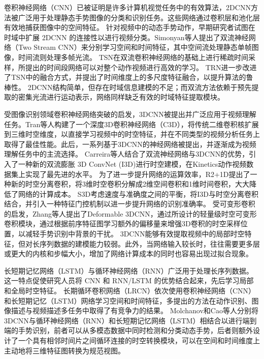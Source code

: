 卷积神经网络（CNN）已被证明是许多计算机视觉任务中的有效算法，2DCNN方法被广泛用于处理静态手势图像的分类和识别任务。这些网络通过卷积层和池化层有效地捕获图像中的空间特征。
针对视频中的动态手势动作，早期研究者试图在时域中扩展 2DCNN 的连接性以进行视频分类\cite{karpathy2014large}。Simonyan等人\cite{simonyan2014twostream}提出了双流神经网络（Two Stream CNN）来分别学习空间和时间特征，其中空间流处理静态单帧图像，时间流则处理多帧光流。
TSN\cite{wang2016tsn}在双流卷积神经网络的基础上进行稀疏时间采样，所提出的时间段网络可以对整个动作视频进行高效的学习。
TRN\cite{zhou2018trn}进一步改进了TSN中的融合方式，并提出了时间维度上的多尺度特征融合，以提升算法的鲁棒性。
2DCNN结构简单，但存在时域信息建模的不足；而双流方法依赖于预先提取的密集光流进行运动表示，网络同样缺乏有效的时域特征提取模块。

受图像识别领域卷积神经网络突破的启发，3DCNN被提出并广泛应用于视频理解任务。Tran等人构建了一个深度3D卷积神经网络（C3D），将传统二维卷积核扩展到三维时空维度，以直接学习视频中的时空特征\cite{tran2015c3d}，并在不同类型的视频分析任务上取得了最佳性能。此后，一系列基于3DCNN的神经网络被提出，并逐渐成为视频理解任务中的主流选择。
Carreira等人\cite{carreira2017i3d}结合了双流神经网络与3DCNN的优势，引入了一种新的双流膨胀 3D ConvNet (I3D)进行时空建模，在Kinetics动作视频数据集上实现了最先进的水平。
为了进一步提升网络的运算效率，R2+1D\cite{tran2018r2+1d}提出了一种新的时空分离卷积，将3维时空卷积分解成2维空间卷积和1维时间卷积，大大降低了网络的计算成本。
S3D\cite{xie2018s3d}考虑速度与准确度之间的平衡，将I3D与时空分离卷积结合，并引入一种特征门控机制以进一步提升网络的识别准确率。
受可变形卷积的启发，Zhang等人提出了Deformable 3DCNN\cite{zhang2020deformable3d}，通过所设计的轻量级时空可变形卷积模块，通过根据前序特征图学习额外的偏移量来增强3D卷积的时空采样位置，以减轻手势识别中背景的干扰。
3DCNN能够有效提取视频中的局部时空特征，但对长序列数据的建模能力较弱。此外，当网络输入较长时，往往需要更多层或更大的内核和步幅大小，增加了网络计算成本的同时也容易出现过拟合现象。

长短期记忆网络（LSTM）\cite{yue2015beyond}与循环神经网络（RNN）\cite{jozefowicz2015empirical}广泛用于处理长序列数据。这一特点促使研究人员将 CNN 和 RNN/LSTM 的优势结合起来，先后学习局部和全局时空特征。
长期循环卷积网络（LRCN）\cite{donahue2015lrcn}依次使用卷积神经网络（CNN）和长短期记忆（LSTM）网络学习空间和时间特征，多提出的方法在动作识别、图像描述与视频描述多任务中取得了有竞争力的结果。
Molchanov\cite{molchanov2016online}和Cao\cite{cao2017egocentric}等人分别将3DCNN与循环神经网络（RNN）和长短期记忆网络（LSTM）相结合以进行端到端的手势识别，前者可以从多模态数据中同时检测和分类动态手势，后者则额外设计了一个具有相邻时间片之间循环连接的时空转换模块，可以在空间和时间维度上主动地将三维特征图转换为规范视图。

